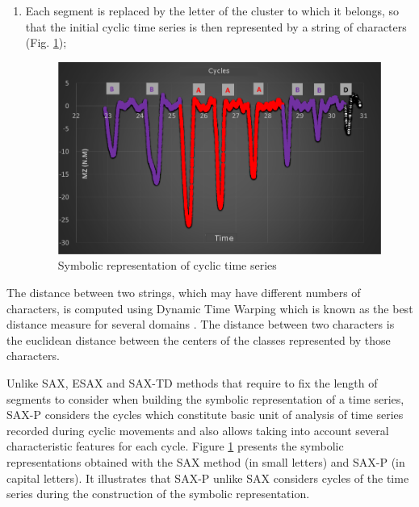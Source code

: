 \begin{enumerate}
	
\item Each segment is replaced by the letter of the cluster to which it
belongs, so that the initial cyclic time series is then represented
by a string of characters (Fig. \ref{fig:symbolic}); 

	 \begin{figure}[h]
  \centering
   \includegraphics[scale=0.4]{images/sax-p/representionSymbolique2_t}
    \caption{Symbolic representation of cyclic time series}
  \label{fig:symbolic}
  \end{figure}
	
 \end{enumerate}

The distance between two strings, which may have different numbers
of characters, is computed using Dynamic Time Warping \cite{Petitjean2014} which is known as the
best distance measure for several domains \cite{Ding2008}. The distance between two characters is
the euclidean distance between the centers of the classes represented by those characters.

Unlike SAX, ESAX and SAX-TD methods that require  to fix the length of segments to consider when 
building the symbolic representation of a time series, SAX-P considers the cycles which
constitute basic unit of analysis of time series recorded during cyclic movements and also 
allows taking into account several characteristic features for each cycle. Figure \ref{fig:symbolic}
presents the symbolic representations obtained with the SAX method (in small letters) and SAX-P (in
capital letters). It illustrates that SAX-P unlike SAX considers cycles of the time series during
the construction of the symbolic representation.


